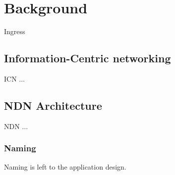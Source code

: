 \chapter{Background}\label{chp:background} 
Ingress


\section{Information-Centric networking}\label{chp2:sec:icn}
\gls{ICN} ...


\section{NDN Architecture}\label{chp2:sec:ndn_architecture}
\gls{NDN} ...

\subsection{Naming}
Naming is left to the application design.